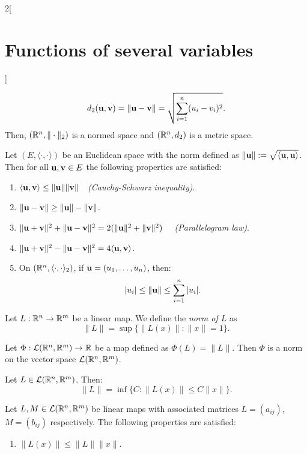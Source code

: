 \documentclass[../../../main.tex]{subfiles}
\begin{document}
\begin{multicols}{2}[\section{Functions of several variables}]
\begin{corollary}
\begin{gather*}
    d_2(\vb{u},\vb{v})=\|\vb{u}-\vb{v}\|=\sqrt{\sum_{i=1}^n(u_i-v_i)^2}.
\end{gather*}
Then, $(\mathbb{R}^n,\|\cdot\|_2)$ is a normed space and $(\mathbb{R}^n,d_2)$ is a metric space.
\end{corollary}
\begin{prop}
Let $(E,\langle\cdot,\cdot\rangle)$ be an Euclidean space with the norm defined as $\|\vb{u}\|:=\sqrt{\langle \vb{u},\vb{u}\rangle}$. Then for all $\vb{u},\vb{v}\in E$ the following properties are satisfied:
\begin{enumerate}
    \item $\langle \vb{u},\vb{v}\rangle\leq\|\vb{u}\|\|\vb{v}\|\quad$\textit{(Cauchy-Schwarz inequality)}.
    \item $\|\vb{u}-\vb{v}\|\geq\|\vb{u}\|-\|\vb{v}\|$.
    \item $\|\vb{u}+\vb{v}\|^2+\|\vb{u}-\vb{v}\|^2=2(\|\vb{u}\|^2+\|\vb{v}\|^2)\quad$ \textit{(Parallelogram law)}.
    \item $\|\vb{u}+\vb{v}\|^2-\|\vb{u}-\vb{v}\|^2=4\langle \vb{u},\vb{v}\rangle$.
    \item On $(\mathbb{R}^n,\langle\cdot,\cdot\rangle_2)$, if $\vb{u}=(u_1,\ldots,u_n)$, then: $$|u_i|\leq\|\vb{u}\|\leq\sum_{i=1}^n|u_i|.$$
\end{enumerate}
\end{prop}
\begin{definition}
Let $L:\mathbb{R}^n\rightarrow\mathbb{R}^m$ be a linear map. We define the \textit{norm of $L$} as $$\|L\|=\sup\{\|L(x)\|:\|x\|=1\}.$$
\end{definition}
\begin{lemma}
Let $\Phi:\mathcal{L}(\mathbb{R}^n,\mathbb{R}^m)\rightarrow\mathbb{R} $ be a map defined as $\Phi(L)=\|L\|$. Then $\Phi$ is a norm on the vector space $\mathcal{L}(\mathbb{R}^n,\mathbb{R}^m)$.
\end{lemma}
\begin{prop}
Let $L\in\mathcal{L}(\mathbb{R}^n,\mathbb{R}^m)$. Then: $$\|L\|=\inf\{C:\|L(x)\|\leq C\|x\|\}.$$
\end{prop}
\begin{corollary}
Let $L,M\in\mathcal{L}(\mathbb{R}^n,\mathbb{R}^m)$ be linear maps with associated matrices $L=(a_{ij})$, $M=(b_{ij})$ respectively. The following properties are satisfied:
\begin{enumerate}
    \item $\|L(x)\|\leq\|L\|\|x\|$.

\end{enumerate}
\end{corollary}
\end{multicols}
\end{document}
